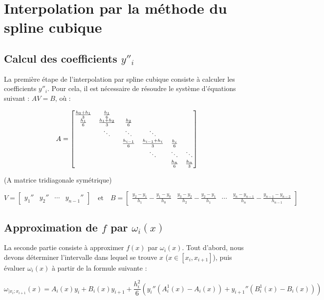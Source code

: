 \documentclass{article}
\begin{document}


\section{Interpolation par la méthode du spline cubique}
\subsection{Calcul des coefficients $y''_i$}
La première étape de l'interpolation par spline cubique consiste à calculer les coefficients $y''_i$. Pour cela, il est nécessaire de résoudre le système d'équations suivant : \( A V = B \), où :

\[
\small
A =
\begin{bmatrix}
\frac{h_0 + h_1}{3} & \frac{h_1}{6} & & & & \\
\frac{h_1}{6} & \frac{h_1 + h_2}{3} & \frac{h_2}{6} & & & \\
& \ddots & \ddots & \ddots & & \\
& & \frac{h_{i-1}}{6} & \frac{h_{i-1} + h_i}{3} & \frac{h_i}{6} & \\
& & & \ddots & \ddots & \ddots \\
& & & & \frac{h_n}{6} & \frac{h_n}{3}
\end{bmatrix}
\normalsize
\]

(A matrice tridiagonale symétrique)

\[
V = \begin{bmatrix}
y_1'' & y_2'' & \cdots & y_{n-1}''
\end{bmatrix}
\quad \text{et} \quad
B = \begin{bmatrix}
\frac{y_2 - y_1}{h_1} - \frac{y_1 - y_0}{h_0} &
\frac{y_3 - y_2}{h_2} - \frac{y_2 - y_1}{h_1} &
\cdots &
\frac{y_n - y_{n-1}}{h_n} - \frac{y_{n-1} - y_{n-2}}{h_{n-1}}
\end{bmatrix}
\]

\subsection{Approximation de $f$ par $\omega_i(x)$}
La seconde partie consiste à approximer $f(x)$ par $\omega_i(x)$. Tout d'abord, nous devons déterminer l'intervalle dans lequel se trouve $x$ ($x \in [x_i, x_{i+1}]$), puis évaluer $\omega_i(x)$ à partir de la formule suivante :

\[
\omega_{|x_i;x_{i+1}}(x) = A_i(x) y_i + B_i(x) y_{i+1}
+ \frac{h_i^2}{6} \left( y_i'' \left( A_i^1(x) - A_i(x) \right) + y_{i+1}'' \left( B_i^1(x) - B_i(x) \right) \right)
\]
\end{document}
